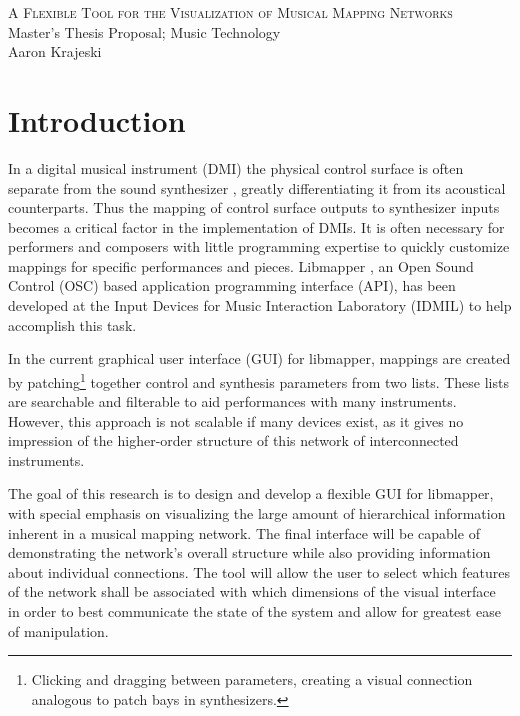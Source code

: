 \documentclass[11pt]{article}
\newcommand{\thetitle}{A Flexible Tool for the Visualization of  Musical Mapping Networks}
\begin{document}
\begin{center}
{\scshape\large \thetitle}\\[0.75\baselineskip]
Master's Thesis Proposal; Music Technology\\
Aaron Krajeski
\end{center}

\thispagestyle{empty}

\section*{Introduction}

In a digital musical instrument (DMI) the physical control surface is often separate from the sound synthesizer \cite{wanderley}, greatly differentiating it from its acoustical counterparts. Thus the mapping of control surface outputs to synthesizer inputs becomes a critical factor in the implementation of DMIs. It is often necessary for performers and composers with little programming expertise to quickly customize mappings for specific performances and pieces.  Libmapper \cite{malloch}, an Open Sound Control (OSC) \cite{osc} based application programming interface (API), has been developed at the Input Devices for Music Interaction Laboratory (IDMIL) to help accomplish this task.

  In the current graphical user interface (GUI) for libmapper, mappings are created by patching\footnote{Clicking and dragging between parameters, creating a visual connection analogous to patch bays in synthesizers.} together control and synthesis parameters from two lists. These lists are searchable and filterable to aid performances with many instruments. However, this approach is not scalable if many devices exist, as it gives no impression of the higher-order structure of this network of interconnected instruments.

  The goal of this research is to design and develop a flexible GUI for libmapper, with special emphasis on visualizing the large amount of hierarchical information inherent in a musical mapping network. The final interface will be capable of demonstrating the network's overall structure while also providing information about individual connections. %
  The tool will allow the user to select which features of the network shall be associated with which dimensions of the visual interface in order to best communicate the state of the system and allow for greatest ease of manipulation.
\end{document}
